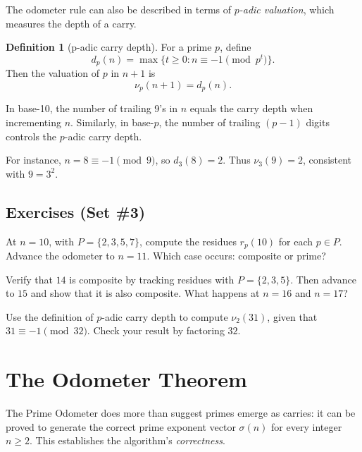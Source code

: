 \documentclass[11pt]{article}
\theoremstyle{definition}
\newtheorem{definition}{Definition}[section]
\begin{document}
The odometer rule can also be described in terms of \emph{$p$-adic valuation}, 
which measures the depth of a carry.

\begin{definition}[p-adic carry depth]
For a prime $p$, define
\[
d_p(n) = \max \{ t \geq 0 : n \equiv -1 \pmod{p^t} \}.
\]
Then the valuation of $p$ in $n+1$ is
\[
\nu_p(n+1) = d_p(n).
\]
\end{definition}

\begin{studentexample}
In base-10, the number of trailing 9’s in $n$ equals the carry depth when incrementing $n$.  
Similarly, in base-$p$, the number of trailing $(p-1)$ digits controls the $p$-adic carry depth.  

For instance, $n=8 \equiv -1 \pmod{9}$, so $d_3(8)=2$.  
Thus $\nu_3(9)=2$, consistent with $9 = 3^2$.
\end{studentexample}

\subsection*{Exercises (Set \#3)}

\begin{studentexercise}
At $n=10$, with $P = \{2,3,5,7\}$, compute the residues $r_p(10)$ for each $p \in P$.  
Advance the odometer to $n=11$.  
Which case occurs: composite or prime?
\end{studentexercise}

\begin{studentexercise}
Verify that $14$ is composite by tracking residues with $P=\{2,3,5\}$.  
Then advance to $15$ and show that it is also composite.  
What happens at $n=16$ and $n=17$?
\end{studentexercise}

\begin{studentexercise}
Use the definition of $p$-adic carry depth to compute $\nu_2(31)$, 
given that $31 \equiv -1 \pmod{32}$.  
Check your result by factoring $32$.
\end{studentexercise}

\section{The Odometer Theorem}

The Prime Odometer does more than suggest primes emerge as carries: 
it can be proved to generate the correct prime exponent vector $\sigma(n)$ 
for every integer $n \geq 2$. 
This establishes the algorithm’s \emph{correctness}. 
\end{document}

